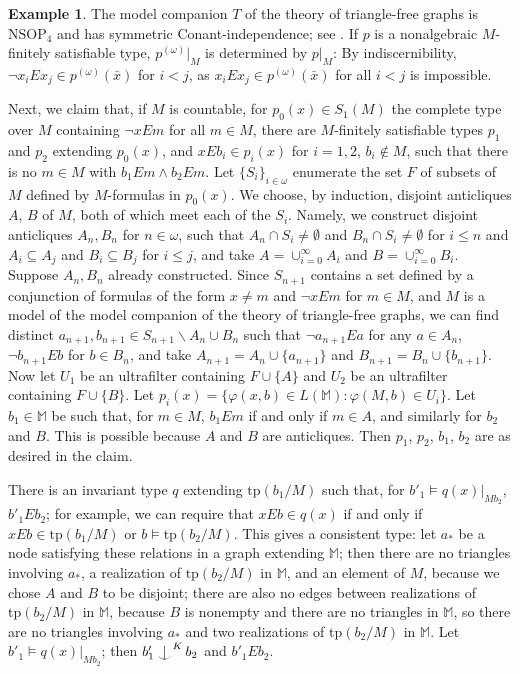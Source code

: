 \documentclass[12pt]{amsart}
\theoremstyle{definition}
\newtheorem{example}[theorem]{Example}
\def\Ind#1#2{#1\setbox0=\hbox{$#1x$}\kern\wd0\hbox to 0pt{\hss$#1\mid$\hss}
\lower.9\ht0\hbox to 0pt{\hss$#1\smile$\hss}\kern\wd0}
\def\ind{\mathop{\mathpalette\Ind{}}}
\begin{document}
\begin{example}
The model companion $T$ of the theory of triangle-free graphs is $\mathrm{NSOP}_{4}$ and has symmetric Conant-independence; see \cite{GFA}. If $p$ is a nonalgebraic $M$-finitely satisfiable type, $p^{(\omega)}|_{M}$ is determined by $p|_{M}$: By  indiscernibility, $\neg x_{i} E x_{j} \in p^{(\omega)}(\bar{x})$ for $i < j$, as $ x_{i} E x_{j} \in p^{(\omega)}(\bar{x})$ for all $ i < j$ is impossible.

Next, we claim that, if $M$ is countable, for $p_{0}(x) \in S_{1}(M)$ the complete type over $M$ containing $\neg x E m$ for all $m \in M$, there are $M$-finitely satisfiable types $p_{1}$ and $p_{2}$ extending $p_{0}(x)$, and $x E b_{i} \in p_{i}(x)$ for $i =1,2$, $b_{i} \notin M$, such that there is no $m \in M$ with $b_{1} E m \wedge b_{2} E m$. Let $\{S_{i}\}_{i \in \omega}$ enumerate the set $F$ of subsets of $M$ defined by $M$-formulas in $p_{0}(x)$. We choose, by induction, disjoint anticliques $A$, $B$ of $M$, both of which meet each of the $S_{i}$. Namely, we construct disjoint anticliques $A_{n}, B_{n}$ for $n \in \omega$, such that $A_{n} \cap S_{i} \neq \emptyset$ and $B_{n} \cap S_{i} \neq \emptyset$ for $i \leq n$ and $A_{i} \subseteq A_{j}$ and $B_{i} \subseteq B_{j}$ for $i \leq j$, and take $A = \cup^{\infty}_{i = 0} A_{i}$ and $B = \cup^{\infty}_{i = 0} B_{i}$. Suppose $A_{n}, B_{n}$ already constructed. Since $S_{n+1}$ contains a set defined by a conjunction of formulas of the form $x \neq m$ and $\neg xEm$ for $m \in M$, and $M$ is a model of the model companion of the theory of triangle-free graphs, we can find distinct $a_{n+1}, b_{n+1} \in S_{n+1} \backslash A_{n} \cup B_{n}$ such that $\neg a_{n+1} E a$ for any $a \in A_{n}$, $\neg b_{n+1} E b$ for $b \in B_{n}$, and take $A_{n+1} = A_{n} \cup \{a_{n+1}\}$ and $B_{n+1} = B_{n} \cup \{b_{n+1}\}$. Now let $U_{1}$ be an ultrafilter containing $F \cup \{A\}$ and $U_{2}$ be an ultrafilter containing $F \cup \{B\}$. Let $p_{i}(x)= \{\varphi(x, b) \in L(\mathbb{M}): \varphi(M, b) \in U_{i}  \}$. Let $b_{1} \in \mathbb{M}$ be such that, for $m \in M$, $b_{1} E m $ if and only if $m \in A$, and similarly for $b_{2}$ and $B$. This is possible because $A$ and $B$ are anticliques. Then $p_{1}$, $p_{2}$, $b_{1}$, $b_{2}$ are as desired in the claim.

There is an invariant type $q$ extending $\mathrm{tp}(b_{1}/M)$ such that, for $b'_{1}\models q(x)|_{Mb_{2}}$, $b'_{1} E b_{2}$; for example, we can require that $x E b \in q(x)$ if and only if $x E b \in \mathrm{tp}(b_{1}/M)$  or $b \models \mathrm{tp}(b_{2}/M)$. This gives a consistent type: let $a_{*}$ be a node satisfying these relations in a graph extending $\mathbb{M}$; then there are no triangles involving $a_{*}$, a realization of $\mathrm{tp}(b_{2}/M)$ in $\mathbb{M}$, and an element of $M$, because we chose $A$ and $B$ to be disjoint; there are also no edges between realizations of $\mathrm{tp}(b_{2}/M)$ in $\mathbb{M}$, because $B$ is nonempty and there are no triangles in $\mathbb{M}$, so there are no triangles involving $a_{*}$ and two realizations of $\mathrm{tp}(b_{2}/M)$ in $\mathbb{M}$. Let $b'_{1} \models q(x)|_{Mb_{2}}$; then $b'_{1} \ind^{K} b_{2}$ and $b'_{1} E b_{2}$.


\end{example}
\end{document}
